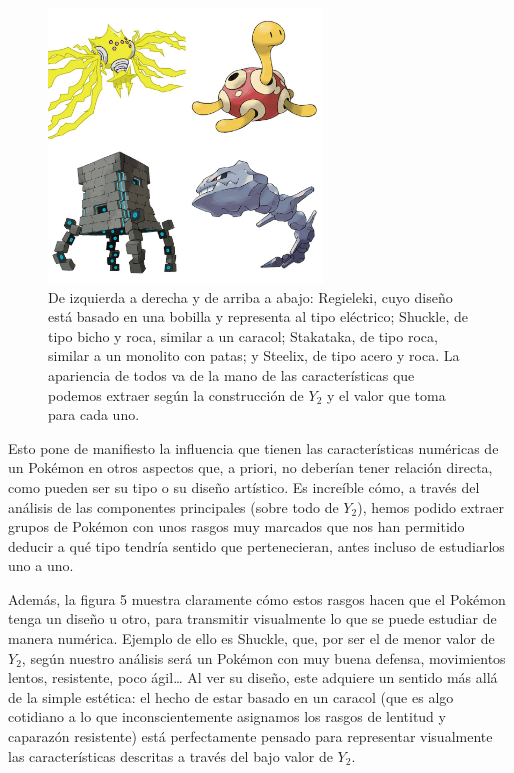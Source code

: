 \documentclass[
  12pt,
]{extreport}
\begin{document}
\begin{figure}[H]

{\centering \includegraphics[width=2.86458in,height=\textheight]{trabajo_images/pokemons.jpg}

}

\caption{De izquierda a derecha y de arriba a abajo: Regieleki, cuyo
diseño está basado en una bobilla y representa al tipo eléctrico;
Shuckle, de tipo bicho y roca, similar a un caracol; Stakataka, de tipo
roca, similar a un monolito con patas; y Steelix, de tipo acero y roca.
La apariencia de todos va de la mano de las características que podemos
extraer según la construcción de \(Y_2\) y el valor que toma para cada
uno.}

\end{figure}%

Esto pone de manifiesto la influencia que tienen las características
numéricas de un Pokémon en otros aspectos que, a priori, no deberían
tener relación directa, como pueden ser su tipo o su diseño artístico.
Es increíble cómo, a través del análisis de las componentes principales
(sobre todo de \(Y_2\)), hemos podido extraer grupos de Pokémon con unos
rasgos muy marcados que nos han permitido deducir a qué tipo tendría
sentido que pertenecieran, antes incluso de estudiarlos uno a uno.

Además, la figura 5 muestra claramente cómo estos rasgos hacen que el
Pokémon tenga un diseño u otro, para transmitir visualmente lo que se
puede estudiar de manera numérica. Ejemplo de ello es Shuckle, que, por
ser el de menor valor de \(Y_2\), según nuestro análisis será un Pokémon
con muy buena defensa, movimientos lentos, resistente, poco ágil\ldots{}
Al ver su diseño, este adquiere un sentido más allá de la simple
estética: el hecho de estar basado en un caracol (que es algo cotidiano
a lo que inconscientemente asignamos los rasgos de lentitud y caparazón
resistente) está perfectamente pensado para representar visualmente las
características descritas a través del bajo valor de \(Y_2\).
\end{document}
